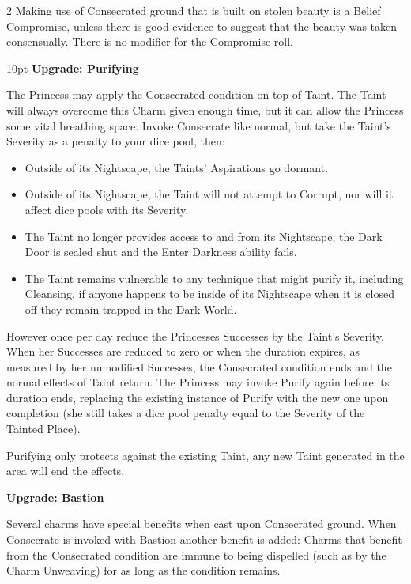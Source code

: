 \begin{multicols}{2}
Making use of Consecrated ground that is built on stolen beauty is a Belief Compromise, unless there is good evidence to suggest that the beauty was taken consensually. There is no modifier for the Compromise roll.

\begin{myindentpar}{10pt} \textbf{Upgrade: Purifying}

The Princess may apply the Consecrated condition on top of Taint. The Taint will always overcome this Charm given enough time, but it can allow the Princess some vital breathing space. Invoke Consecrate like normal, but take the Taint’s Severity as a penalty to your dice pool, then:

   \begin{itemize} \item Outside of its Nightscape, the Taints’ Aspirations go dormant. 
    \item Outside of its Nightscape, the Taint will not attempt to Corrupt, nor will it affect dice pools with its Severity.
    \item The Taint no longer provides access to and from its Nightscape, the Dark Door is sealed shut and the Enter Darkness ability fails.
	\item The Taint remains vulnerable to any technique that might purify it, including Cleansing, if anyone happens to be inside of its Nightscape when it is closed off they remain trapped in the Dark World. \end{itemize}

However once per day reduce the Princesses Successes by the Taint’s Severity. When her Successes are reduced to zero or when the duration expires, as measured by her unmodified Successes, the Consecrated condition ends and the normal effects of Taint return. The Princess may invoke Purify again before its duration ends, replacing the existing instance of Purify with the new one upon completion (she still takes a dice pool penalty equal to the Severity of the Tainted Place).

Purifying only protects against the existing Taint, any new Taint generated in the area will end the effects.

\textbf{Upgrade: Bastion}

Several charms have special benefits when cast upon Consecrated ground. When Consecrate is invoked with Bastion another benefit is added: Charms that benefit from the Consecrated condition are immune to being dispelled (such as by the Charm Unweaving) for as long as the condition remains.


\end{myindentpar}
\end{multicols}
